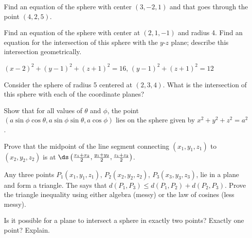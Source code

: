 \begin{enumialphparenastyle}
\begin{ex}
Find an equation of the sphere with center $(3,-2,1)$ and
that goes through the point $(4,2,5)$.
\end{ex}

\begin{ex}
Find an equation of the sphere with center at $(2,1,-1)$ and
radius 4. Find an equation for the intersection of this sphere with
the $y$-$z$ plane; describe this intersection geometrically.
\begin{sol}
$(x-2)^2+(y-1)^2+(z+1)^2=16$,
$(y-1)^2+(z+1)^2=12$
\end{sol}
\end{ex}

\begin{ex}
Consider the sphere of radius 5 centered at $(2,3,4)$.  What is
the intersection of this sphere with each of the coordinate planes?
\end{ex}

\begin{ex}
Show that for all values of $\theta$ and $\phi$, the point
$(a\sin\phi\cos\theta,a\sin\phi\sin\theta,a\cos\phi)$ lies on the
sphere given by $x^2+y^2+z^2=a^2$.
\end{ex}

\begin{ex}
Prove that the midpoint of the line segment connecting
$(x_1,y_1,z_1)$ to $(x_2,y_2,z_2)$ is at 
$\ds\left({x_1+x_2\over 2},{y_1+y_2\over 2},{z_1+z_2\over 2}\right)$.
\end{ex}

\begin{ex}
Any three points $P_1(x_1,y_1,z_1)$, $P_2(x_2,y_2,z_2)$,
$P_3(x_3,y_3,z_3)$, lie in a plane and form a triangle.  The 
says that $ d(P_1,P_3)\le d(P_1,P_2)+d(P_2,P_3)$.  Prove the triangle inequality
using either algebra (messy) or the law of cosines (less messy).
\end{ex}

\begin{ex}
Is it possible for a plane to intersect a sphere in exactly two
points?  Exactly one point? Explain.  
\end{ex}

\end{enumialphparenastyle}
